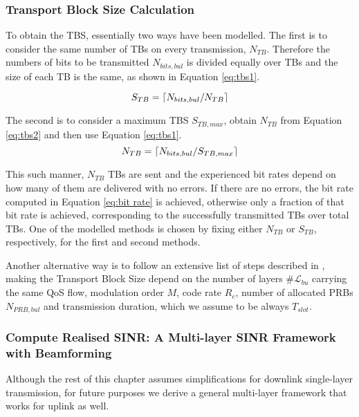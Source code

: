 \subsubsection*{Transport Block Size Calculation}

To obtain the \ac{TBS}, essentially two ways have been modelled. The first is to consider the same number of TBs on every transmission, $N_{TB}$. Therefore the numbers of bits to be transmitted $N_{bits, bul}$ is divided equally over TBs and the size of each TB is the same, as shown in Equation \eqref{eq:tbs1}.


\begin{equation} \label{eq:tbs1}
    S_{TB} = \lceil N_{bits, bul}/N_{TB}\rceil    
\end{equation}

The second is to consider a maximum TBS $S_{TB, max}$, obtain $N_{TB}$ from Equation \eqref{eq:tbs2} and then use Equation \eqref{eq:tbs1}. 
\begin{equation} \label{eq:tbs2}
    N_{TB} = \lceil N_{bits, bul}/S_{TB, max}\rceil
\end{equation}

This such manner, $N_{TB}$ TBs are sent and the experienced bit rates depend on how many of them are delivered with no errors. If there are no errors, the bit rate computed in Equation \eqref{eq:bit rate} is achieved, otherwise only a fraction of that bit rate is achieved, corresponding to the successfully transmitted TBs over total TBs. One of the modelled methods is chosen by fixing either $N_{TB}$ or $S_{TB}$, respectively, for the first and second methods.

Another alternative way is to follow an extensive list of steps described in \cite{3gpp-codebooks}, making the Transport Block Size depend on the number of layers $\#\mathcal{L}_{bu}$ carrying the same QoS flow, modulation order $M$, code rate $R_c$, number of allocated PRBs $N_{PRB, bul}$ and transmission duration, which we assume to be always $T_{slot}$.


\subsubsection*{Compute Realised SINR: A Multi-layer SINR Framework with Beamforming}
\label{sec:sinr_framework}

Although the rest of this chapter assumes simplifications for downlink  single-layer transmission, for future purposes we derive a general multi-layer framework that works for uplink as well. 

